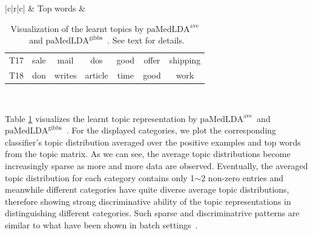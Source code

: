 \documentclass[twoside,11pt]{article}
\newcommand\paMedLDAave{$\text{paMedLDA}^{\text{ave}}$~}
\newcommand\paMedLDAgibbs{$\text{paMedLDA}^{\text{gibbs}}$~}
\begin{document}
\begin{table}[t]
\begin{center}
{\begin{tabular}{|c|r|c|}
& Top words &
\begin{tabular}{r|cccccc}
 T17 & sale & mail & dos & good & offer & shipping \\
 T18 & don & writes & article & time & good & work
\end{tabular}
\\


\hline\hline
\end{tabular} }
\end{center}\vspace*{-0.2cm}
\caption{Visualization of the learnt topics by \paMedLDAave and \paMedLDAgibbs. See text for details.}\vspace{-.3cm}
\label{tb:visualization_gibbs}
\end{table}


Table \ref{tb:visualization_gibbs} visualizes the learnt topic representation by \paMedLDAave and \paMedLDAgibbs. For the displayed categories, we plot the corresponding classifier's topic distribution averaged over the positive examples and top words from the topic matrix. As we can see, the average topic distributions become increasingly sparse as more and more data are observed. Eventually, the averaged topic distribution for each category contains only 1$\sim$2 non-zero entries and meanwhile different categories have quite diverse average topic distributions, therefore showing strong discriminative ability of the topic representations in distinguishing different categories. Such sparse and discriminatrive patterns are similar to what have been shown in batch settings~\citep{zhu2012medlda, zhugibbs2013}.



\end{document}
